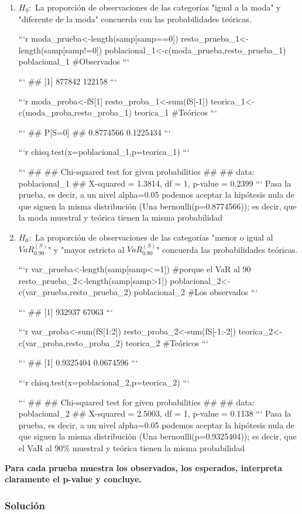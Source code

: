 \documentclass[
]{article}
\begin{document}
\begin{enumerate}[label=(\alph*)]
\item $H_0:$  La proporción de observaciones de las categorías "igual a la moda" y "diferente de la moda" concuerda con las probabilidades teóricas.

```r
moda_prueba<-length(samp[samp==0])
resto_prueba_1<-length(samp[samp!=0])
poblacional_1<-c(moda_prueba,resto_prueba_1)
poblacional_1 #Observados
```

```
## [1] 877842 122158
```

```r
moda_proba<-fS[1]
resto_proba_1<-sum(fS[-1])
teorica_1<-c(moda_proba,resto_proba_1)
teorica_1 #Teóricos
```

```
##    P[S=0]           
## 0.8774566 0.1225434
```

```r
chisq.test(x=poblacional_1,p=teorica_1)
```

```
## 
##  Chi-squared test for given probabilities
## 
## data:  poblacional_1
## X-squared = 1.3814, df = 1, p-value = 0.2399
```
Pasa la prueba, es decir, a un nivel alpha=0.05 podemos aceptar la hipótesis nula de que siguen la misma distribución (Una bernoulli(p=0.8774566)); es decir, que la moda muestral y teórica tienen la misma probabilidad

\item $H_0:$  La proporción de observaciones de las categorías "menor o igual al $VaR_{0.90}^{(S)}$" y "mayor estricto al $VaR_{0.90}^{(S)}$" concuerda las probabilidades teóricas.

```r
var_prueba<-length(samp[samp<=1]) #porque el VaR al 90%
resto_prueba_2<-length(samp[samp>1])
poblacional_2<-c(var_prueba,resto_prueba_2)
poblacional_2 #Los observados
```

```
## [1] 932937  67063
```

```r
var_proba<-sum(fS[1:2])
resto_proba_2<-sum(fS[-1:-2])
teorica_2<-c(var_proba,resto_proba_2)
teorica_2 #Teóricos
```

```
## [1] 0.9325404 0.0674596
```

```r
chisq.test(x=poblacional_2,p=teorica_2)
```

```
## 
##  Chi-squared test for given probabilities
## 
## data:  poblacional_2
## X-squared = 2.5003, df = 1, p-value = 0.1138
```
Pasa la prueba, es decir, a un nivel alpha=0.05 podemos aceptar la hipótesis nula de que siguen la misma distribución (Una bernoulli(p=0.9325404)); es decir, que el VaR al 90\% muestral y teórica tienen la misma probabilidad

\end{enumerate}

\textbf{Para cada prueba muestra los observados, los esperados,
interpreta claramente el p-value y concluye.}

\hypertarget{soluciuxf3n-9}{%
\subsubsection{Solución}\label{soluciuxf3n-9}}
\end{document}
